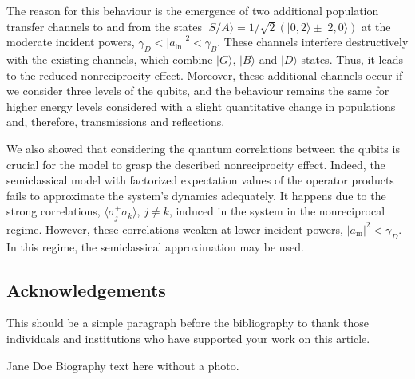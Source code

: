 \documentclass[lettersize,journal]{IEEEtran}
\begin{document}
The reason for this behaviour is the emergence of two additional population transfer channels to and from the states $|S/A\rangle = 1/\sqrt{2} \left( |0,2\rangle \pm |2,0\rangle \right)$ at the moderate incident powers, $\gamma_D < |a_\mathrm{in}|^2 < \gamma_B$.
These channels interfere destructively with the existing channels, which combine $|G\rangle$, $|B\rangle$ and $|D\rangle$ states.
Thus, it leads to the reduced nonreciprocity effect.
Moreover, these additional channels occur if we consider three levels of the qubits, and the behaviour remains the same for higher energy levels considered with a slight quantitative change in populations and, therefore, transmissions and reflections.

We also showed that considering the quantum correlations between the qubits is crucial for the model to grasp the described nonreciprocity effect.
Indeed, the semiclassical model with factorized expectation values of the operator products fails to approximate the system's dynamics adequately.
It happens due to the strong correlations, $\langle \sigma_j^+ \sigma_k \rangle$, $j\neq k$, induced in the system in the nonreciprocal regime.
However, these correlations weaken at lower incident powers, $|a_\mathrm{in}|^2 < \gamma_D$.
In this regime, the semiclassical approximation may be used.


\subsection*{Acknowledgements}
\noindent This should be a simple paragraph before the bibliography to thank those individuals and institutions who have supported your work on this article.





\begin{IEEEbiographynophoto}{Jane Doe}
Biography text here without a photo.
\end{IEEEbiographynophoto}

\end{document}
